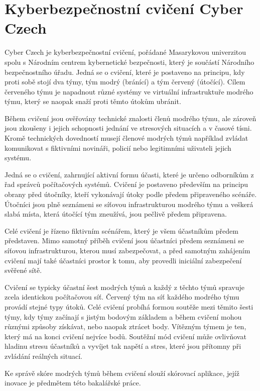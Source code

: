 \documentclass[
  digital,
  twoside,
  table, 
  nolof, 
  nolot
]{fithesis3}
\begin{document}
\section{Kyberbezpečnostní cvičení Cyber Czech}

Cyber Czech je kyberbezpečnostní cvičení, pořádané Masarykovou univerzitou spolu s Národním centrem kybernetické bezpečnosti, který je součástí Národního bezpečnostního úřadu. Jedná se o cvičení, které je postaveno na principu, kdy proti sobě stojí dva týmy, tým modrý (bránící) a tým červený (útočící). Cílem červeného týmu je napadnout různé systémy ve virtuální infrastruktuře modrého týmu, který se naopak snaží proti těmto útokům ubránit.

Během cvičení jsou ověřovány technické znalosti členů modrého týmu, ale zároveň jsou zkoušeny i jejich schopnosti jednání ve stresových situacích a v časové tísni. Kromě technických dovedností musejí členové modrých týmů například zvládat komunikovat s fiktivními novináři, policií nebo legitimními uživateli jejich systému.

Jedná se o cvičení, zahrnující aktivní formu účasti, které je určeno odborníkům z řad správců počítačových systémů. Cvičení je postaveno především na principu obrany před útočníky, kteří vykonávají útoky podle předem připraveného scénáře. Útočníci jsou plně seznámeni se síťovou infrastrukturou modrého týmu a veškerá slabá místa, která útočící tým zneužívá, jsou pečlivě předem připravena.

Celé cvičení je řízeno fiktivním scénářem, který je všem účastníkům předem představen. Mimo samotný příběh cvičení jsou účastníci předem seznámeni se síťovou infrastrukturou, kterou musí zabezpečovat, a před samotným zahájením cvičení mají také účastníci prostor k tomu, aby provedli iniciální zabezpečení svěřené sítě.

Cvičení se typicky účastní šest modrých týmů a každý z těchto týmů spravuje zcela identickou počítačovou síť. Červený tým na síť každého modrého týmu provádí stejné typy útoků. Celé cvičení probíhá formou soutěže mezi těmito šesti týmy, kdy týmy začínají s jistým bodovým základem a během cvičení mohou různými způsoby získávat, nebo naopak ztrácet body. Vítězným týmem je ten, který má na konci cvičení nejvíce bodů. Soutěžní mód cvičení může ovlivňovat hladinu stresu účastníků a vyvíjet tak napětí a stres, které jsou přítomny při zvládání reálných situací.

Ke správě skóre modrých týmů během cvičení slouží skórovací aplikace, jejíž inovace je předmětem této bakalářské práce. 
\end{document}
